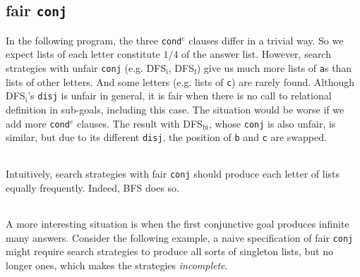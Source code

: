 \documentclass[format=acmlarge, review=true, authordraft=true]{acmart}
\newcommand{\conde}{\texttt{cond$^e$} }
\newcommand{\conj}{\texttt{conj}}
\newcommand{\disj}{\texttt{disj}}
\begin{document}
\begin{center}
	\begin{tabular}{c}
		
	\end{tabular}
\end{center}

\subsection{fair \texttt{conj}}

In the following program, the three \conde clauses differ in a trivial way. So 
we expect lists of each letter constitute $1/4$ of the answer list. However, 
search strategies with unfair \conj{} (e.g. DFS$_\textrm{i}$, DFS$_\textrm{f}$) give us much 
more lists of \texttt{a}s than lists of other letters. And some letters (e.g. lists 
of \texttt{c}) are rarely found. Although DFS$_\textrm{i}$'s \disj{} is unfair in general, 
it is fair when there is no call to relational definition in sub-goals, 
including this case. The situation would be worse if we add more \conde 
clauses. The result with DFS$_\textrm{bi}$, whose \conj{} is also unfair, is similar, but 
due to its different \disj{}, the position of \texttt{b} and \texttt{c} are 
swapped. 

\begin{center}
	\begin{tabular}{c}
		
	\end{tabular}
\end{center}

Intuitively, search strategies with fair \conj{} should produce each letter of 
lists equally frequently. Indeed, BFS does so.

\begin{center}
	\begin{tabular}{c}
		
	\end{tabular}
\end{center}

A more interesting situation is when the first conjunctive goal produces 
infinite many answers. Consider the following example, a naive specification of 
fair \conj{} might require search strategies to produce all sorts of singleton 
lists, but no longer ones, which makes the strategies \emph{incomplete}. 

\begin{center}
	\begin{tabular}{c}
		
	\end{tabular}
\end{center}
\end{document}

